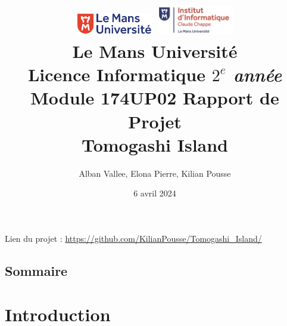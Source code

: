 \documentclass{article}
\begin{document}
\begin{titlepage}
    \title{
        \includegraphics[width=0.25\textwidth]{logolemansU.png}
        \hspace{150pt}
        \includegraphics[width=0.25\textwidth]{logo_IC2.png}
        \\[2cm]
        \color{blue} \textbf{Le Mans Université} \\
        \color{black} Licence Informatique \textit{$2^{e}$ année} \\
        Module 174UP02 Rapport de Projet \\
        \textbf{Tomogashi Island}
    }
    \author{Alban Vallee, Elona Pierre, Kilian Pousse  }
    \date{6 avril 2024}
    \maketitle
    
     \newline 
    
    Lien du projet : \url{https://github.com/KilianPousse/Tomogashi_Island/}

\end{titlepage}

   


\newpage
\begin{center}
\section*{Sommaire}
\tableofcontents
\end{center}


\newpage
\section{Introduction} 
\end{document}
